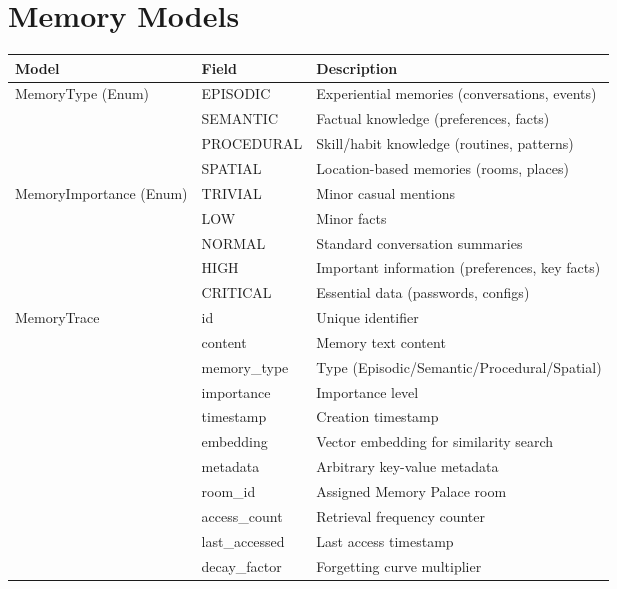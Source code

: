 \documentclass[12pt,a4paper,twoside]{report}
\begin{document}
\section{Memory Models}

\begin{table}[H]
\centering
{}
\begin{tabularx}{\textwidth}{|l|l|X|}
\hline
\rowcolor{phiblue!20}
\textbf{Model} & \textbf{Field} & \textbf{Description} \\
\hline
\multirow{4}{*}{MemoryType (Enum)} & EPISODIC & Experiential memories (conversations, events) \\
\cline{2-3}
 & SEMANTIC & Factual knowledge (preferences, facts) \\
\cline{2-3}
 & PROCEDURAL & Skill/habit knowledge (routines, patterns) \\
\cline{2-3}
 & SPATIAL & Location-based memories (rooms, places) \\
\hline
\multirow{5}{*}{MemoryImportance (Enum)} & TRIVIAL & Minor casual mentions \\
\cline{2-3}
 & LOW & Minor facts \\
\cline{2-3}
 & NORMAL & Standard conversation summaries \\
\cline{2-3}
 & HIGH & Important information (preferences, key facts) \\
\cline{2-3}
 & CRITICAL & Essential data (passwords, configs) \\
\hline
\multirow{12}{*}{MemoryTrace} & id & Unique identifier \\
\cline{2-3}
 & content & Memory text content \\
\cline{2-3}
 & memory\_type & Type (Episodic/Semantic/Procedural/Spatial) \\
\cline{2-3}
 & importance & Importance level \\
\cline{2-3}
 & timestamp & Creation timestamp \\
\cline{2-3}
 & embedding & Vector embedding for similarity search \\
\cline{2-3}
 & metadata & Arbitrary key-value metadata \\
\cline{2-3}
 & room\_id & Assigned Memory Palace room \\
\cline{2-3}
 & access\_count & Retrieval frequency counter \\
\cline{2-3}
 & last\_accessed & Last access timestamp \\
\cline{2-3}
 & decay\_factor & Forgetting curve multiplier \\

\end{tabularx}
\end{table}
\end{document}
